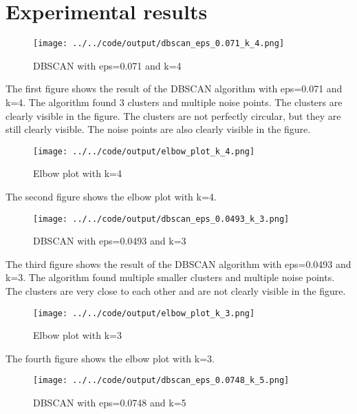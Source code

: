 \documentclass[twoside, a4paper, fleqn, reqno]{article}
\begin{document}
\section{Experimental results}

\begin {figure}[H]
	\centering
	\texttt{[image: ../../code/output/dbscan\_eps\_0.071\_k\_4.png]}
	\caption{DBSCAN with eps=0.071 and k=4}
	\label{fig:dbscan_eps_0.071_k_4}
\end {figure}

The first figure shows the result of the DBSCAN algorithm with eps=0.071 and k=4.
The algorithm found 3 clusters and multiple noise points.
The clusters are clearly visible in the figure.
The clusters are not perfectly circular, but they are still clearly visible.
The noise points are also clearly visible in the figure.

\begin {figure}[H]
	\centering
	\texttt{[image: ../../code/output/elbow\_plot\_k\_4.png]}
	\caption{Elbow plot with k=4}
	\label{fig:elbow_plot_k_4}
\end {figure}

The second figure shows the elbow plot with k=4.

\begin {figure}[H]
	\centering
	\texttt{[image: ../../code/output/dbscan\_eps\_0.0493\_k\_3.png]}
	\caption{DBSCAN with eps=0.0493 and k=3}
	\label{fig:dbscan_eps_0.0493_k_3}
\end {figure}

The third figure shows the result of the DBSCAN algorithm with eps=0.0493 and k=3.
The algorithm found multiple smaller clusters and multiple noise points.
The clusters are very close to each other and are not clearly visible in the figure.

\begin {figure}[H]
	\centering
	\texttt{[image: ../../code/output/elbow\_plot\_k\_3.png]}
	\caption{Elbow plot with k=3}
	\label{fig:elbow_plot_k_3}
\end {figure}

The fourth figure shows the elbow plot with k=3.

\begin {figure}[H]
	\centering
	\texttt{[image: ../../code/output/dbscan\_eps\_0.0748\_k\_5.png]}
	\caption{DBSCAN with eps=0.0748 and k=5}
	\label{fig:dbscan_eps_0.0748_k_5}
\end {figure}
\end{document}
